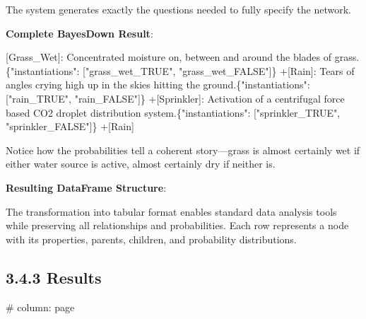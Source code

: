 \documentclass[
  11pt,
  letterpaper,
]{book}
\newenvironment{Shaded}{\begin{snugshade}}{\end{snugshade}}
\newcommand{\CommentTok}[1]{\textcolor[rgb]{0.37,0.37,0.37}{#1}}
\newcommand{\NormalTok}[1]{\textcolor[rgb]{0.00,0.23,0.31}{#1}}
\newcommand{\OtherTok}[1]{\textcolor[rgb]{0.00,0.23,0.31}{#1}}
\begin{document}
\begin{landscape}
The system generates exactly the questions needed to fully specify the
network.

\textbf{Complete BayesDown Result}:

\begin{Shaded}
\begin{Highlighting}[]
\OtherTok{[Grass\_Wet]: }\NormalTok{Concentrated moisture on, between and around the blades of grass.\{"instantiations": }\CommentTok{[}\OtherTok{"grass\_wet\_TRUE", "grass\_wet\_FALSE"}\CommentTok{]}\NormalTok{\}    }
\NormalTok{    +}\CommentTok{[}\OtherTok{Rain}\CommentTok{]}\NormalTok{: Tears of angles crying high up in the skies hitting the ground.\{"instantiations": }\CommentTok{[}\OtherTok{"rain\_TRUE", "rain\_FALSE"}\CommentTok{]}\NormalTok{\}}
\NormalTok{    +}\CommentTok{[}\OtherTok{Sprinkler}\CommentTok{]}\NormalTok{: Activation of a centrifugal force based CO2 droplet distribution system.\{"instantiations": }\CommentTok{[}\OtherTok{"sprinkler\_TRUE", "sprinkler\_FALSE"}\CommentTok{]}\NormalTok{\}}
\NormalTok{        +}\CommentTok{[}\OtherTok{Rain}\CommentTok{]}
\end{Highlighting}
\end{Shaded}

Notice how the probabilities tell a coherent story---grass is almost
certainly wet if either water source is active, almost certainly dry if
neither is.

\textbf{Resulting DataFrame Structure}:

The transformation into tabular format enables standard data analysis
tools while preserving all relationships and probabilities. Each row
represents a node with its properties, parents, children, and
probability distributions.

\subsection{3.4.3 Results}\label{sec-rsg-results}

\#\textbar{} column: page


\end{landscape}
\end{document}

